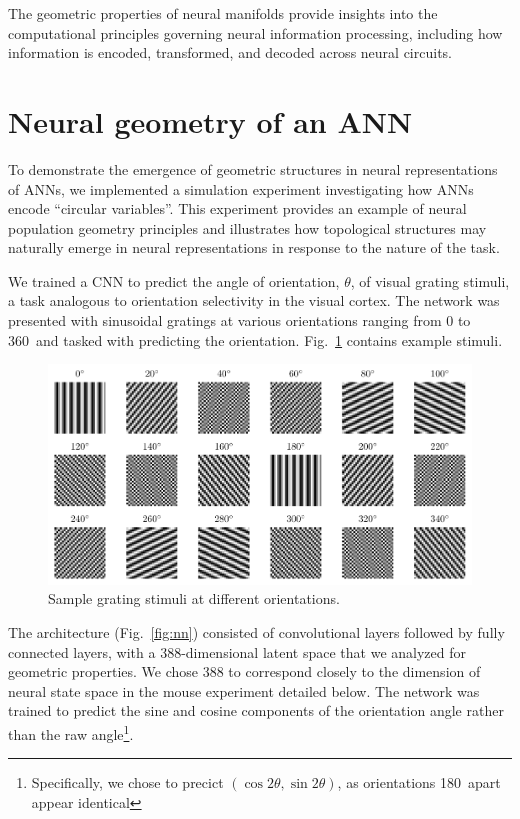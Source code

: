 \documentclass[11pt,a4paper]{article}
\begin{document}
The geometric properties of neural manifolds provide insights into the computational principles governing neural information processing, including how information is encoded, transformed, and decoded across neural circuits.


\section{Neural geometry of an ANN}

To demonstrate the emergence of geometric structures in neural representations of ANNs, we implemented a simulation experiment investigating how ANNs encode ``circular variables''. This experiment provides an example of neural population geometry principles and illustrates how topological structures may naturally emerge in neural representations in response to the nature of the task.


We trained a CNN to predict the angle of orientation, $\theta$, of visual grating stimuli, a task analogous to orientation selectivity in the visual cortex. The network was presented with sinusoidal gratings at various orientations ranging from 0 to 360\textdegree\ and tasked with predicting the orientation. Fig.~\ref{fig:grating_samples} contains example stimuli.

\begin{figure}
    \centering
    \includegraphics[width=0.5\linewidth]{results/grating_samples.pdf}
    \caption{Sample grating stimuli at different orientations.}
    \label{fig:grating_samples}
\end{figure}

The architecture (Fig.~\ref{fig:nn}) consisted of convolutional layers followed by fully connected layers, with a 388-dimensional latent space that we analyzed for geometric properties. We chose 388 to correspond closely to the dimension of neural state space in the mouse experiment detailed below. The network was trained to predict the sine and cosine components of the orientation angle rather than the raw angle\footnote{Specifically, we chose to precict $(\cos2\theta, \sin2\theta)$, as orientations 180\textdegree\ 
 apart appear identical}.
\end{document}
